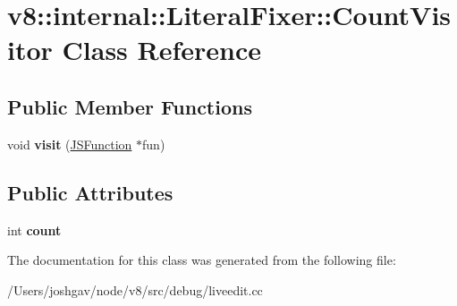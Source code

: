 \hypertarget{classv8_1_1internal_1_1_literal_fixer_1_1_count_visitor}{}\section{v8\+:\+:internal\+:\+:Literal\+Fixer\+:\+:Count\+Visitor Class Reference}
\label{classv8_1_1internal_1_1_literal_fixer_1_1_count_visitor}
\subsection*{Public Member Functions}
\begin{DoxyCompactItemize}
\item 
void {\bfseries visit} (\hyperlink{classv8_1_1internal_1_1_j_s_function}{J\+S\+Function} $\ast$fun)\hypertarget{classv8_1_1internal_1_1_literal_fixer_1_1_count_visitor_a3384a30fabac78ba9e12661ff8358bc4}{}\label{classv8_1_1internal_1_1_literal_fixer_1_1_count_visitor_a3384a30fabac78ba9e12661ff8358bc4}

\end{DoxyCompactItemize}
\subsection*{Public Attributes}
\begin{DoxyCompactItemize}
\item 
int {\bfseries count}\hypertarget{classv8_1_1internal_1_1_literal_fixer_1_1_count_visitor_ab28a85ae75463f78aa1648cc1fa3c916}{}\label{classv8_1_1internal_1_1_literal_fixer_1_1_count_visitor_ab28a85ae75463f78aa1648cc1fa3c916}

\end{DoxyCompactItemize}


The documentation for this class was generated from the following file\+:\begin{DoxyCompactItemize}
\item 
/\+Users/joshgav/node/v8/src/debug/liveedit.\+cc\end{DoxyCompactItemize}
